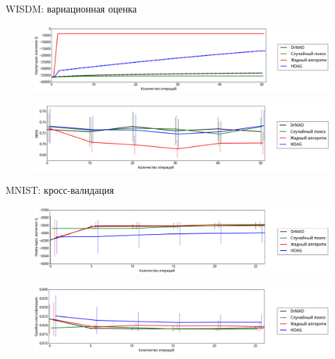 \documentclass[11pt,pdf,utf8,russian,aspectratio=169]{beamer}
\begin{document}
\begin{frame}{WISDM: вариационная оценка}
\begin{figure}[h]
\includegraphics[width=\textwidth]{./slide_plots/wisdm_q_var.png}
\end{figure}
\begin{figure}[h]
\includegraphics[width=\textwidth]{./slide_plots/wisdm_e_var.png}
\end{figure}
\end{frame}

\begin{frame}{MNIST: кросс-валидация}
\begin{figure}[h]
\includegraphics[width=\textwidth]{./slide_plots/mnist_q_cv.png}
\end{figure}
\begin{figure}[h]
\includegraphics[width=\textwidth]{./slide_plots/mnist_e_cv.png}
\end{figure}
\end{frame}
\end{document}
